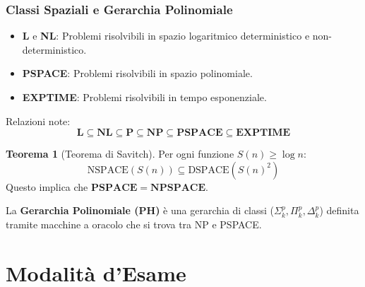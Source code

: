 \documentclass[a4paper]{article}
\theoremstyle{definition} %
\newtheorem{theorem}{Teorema}
\begin{document}
\subsubsection{Classi Spaziali e Gerarchia Polinomiale}
\begin{itemize}
    \item \textbf{L} e \textbf{NL}: Problemi risolvibili in spazio logaritmico deterministico e non-deterministico.
    \item \textbf{PSPACE}: Problemi risolvibili in spazio polinomiale.
    \item \textbf{EXPTIME}: Problemi risolvibili in tempo esponenziale.
\end{itemize}
Relazioni note:
$$ \mathbf{L} \subseteq \mathbf{NL} \subseteq \mathbf{P} \subseteq \mathbf{NP} \subseteq \mathbf{PSPACE} \subseteq \mathbf{EXPTIME} $$
\begin{theorem}[Teorema di Savitch]
Per ogni funzione $S(n) \ge \log n$:
$$ \text{NSPACE}(S(n)) \subseteq \text{DSPACE}(S(n)^2) $$
Questo implica che $\mathbf{PSPACE} = \mathbf{NPSPACE}$.
\end{theorem}
La \textbf{Gerarchia Polinomiale (PH)} è una gerarchia di classi ($\Sigma_k^p, \Pi_k^p, \Delta_k^p$) definita tramite macchine a oracolo che si trova tra NP e PSPACE.

\section{Modalità d'Esame}
\end{document}

